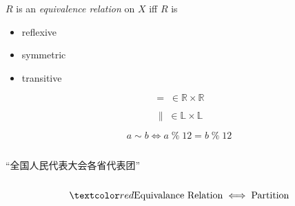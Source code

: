
\begin{frame}{}
  \begin{center}
  \end{center}
\end{frame}

\begin{frame}{}
  \begin{definition}
    $R$ is an {\it equivalence relation} on $X$ iff $R$ is 
    \begin{itemize}
      \item reflexive 
      \item symmetric
      \item transitive
    \end{itemize}
  \end{definition}

  \pause
  \[
    =\; \in \mathbb{R} \times \mathbb{R}
  \]

  \pause
  \[
    \parallel\; \in \mathbb{L} \times \mathbb{L}
  \]

  \pause
  \[
    a \sim b \iff a \;\%\; 12 = b \;\%\; 12
  \]

  \pause
  \begin{center}
  \end{center}
\end{frame}

\begin{frame}{}
  \begin{center}
  \end{center}

  \begin{columns}
      \pause
      \pause
      \begin{center}
	``全国人民代表大会各省代表团''
      \end{center}
  \end{columns}

  \pause
  \vspace{0.60cm}
  \[
    \red{\text{Equivalance Relation} \iff \text{Partition}}
  \]
\end{frame}

